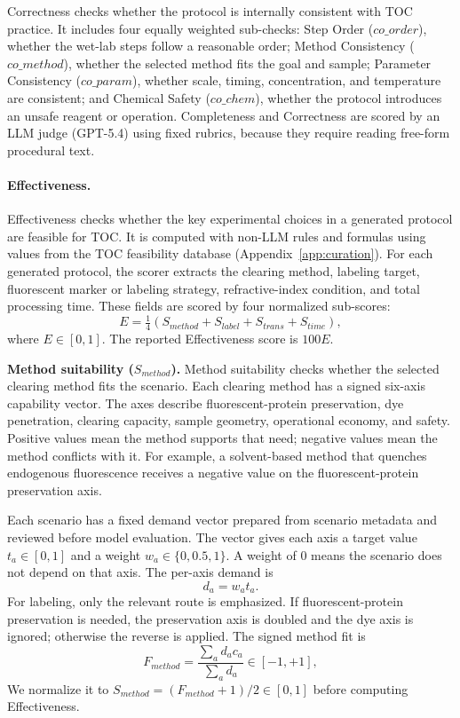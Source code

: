 \documentclass[conference]{IEEEtran}
\begin{document}
Correctness checks whether the protocol is internally consistent with TOC
practice. It includes four equally weighted sub-checks: Step Order
($co\_order$), whether the wet-lab steps follow a reasonable order; Method
Consistency ($co\_method$), whether the selected method fits the goal and
sample; Parameter Consistency ($co\_param$), whether scale, timing,
concentration, and temperature are consistent; and Chemical Safety
($co\_chem$), whether the protocol introduces an unsafe reagent or operation.
Completeness and Correctness are scored by an LLM judge (GPT-5.4) using fixed
rubrics, because they require reading free-form procedural text.

\paragraph{Effectiveness.}
Effectiveness checks whether the key experimental choices in a generated
protocol are feasible for TOC. It is computed with non-LLM rules and formulas
using values from the TOC feasibility database
(Appendix~\ref{app:curation}). For each generated protocol, the scorer extracts
the clearing method, labeling target, fluorescent marker or labeling strategy,
refractive-index condition, and total processing time. These fields are scored
by four normalized sub-scores:
\begin{equation}
E =
\tfrac{1}{4}
\left(
S_{method} + S_{label} + S_{trans} + S_{time}
\right),
\end{equation}
where $E\in[0,1]$. The reported Effectiveness score is $100E$.

\noindent\textbf{Method suitability ($S_{method}$).}
Method suitability checks whether the selected clearing method fits the scenario.
Each clearing method has a signed six-axis capability vector. The axes describe
fluorescent-protein preservation, dye penetration, clearing capacity, sample
geometry, operational economy, and safety. Positive values mean the method
supports that need; negative values mean the method conflicts with it. For
example, a solvent-based method that quenches endogenous fluorescence receives a
negative value on the fluorescent-protein preservation axis.

Each scenario has a fixed demand vector prepared from scenario metadata and
reviewed before model evaluation. The vector gives each axis a target value
$t_a\in[0,1]$ and a weight $w_a\in\{0,0.5,1\}$. A weight of $0$ means the
scenario does not depend on that axis. The per-axis demand is
\[
d_a = w_a t_a .
\]
For labeling, only the relevant route is emphasized. If fluorescent-protein
preservation is needed, the preservation axis is
doubled and the dye axis is ignored; otherwise the reverse is applied.
The signed method fit is
\begin{equation}
F_{method}
= \frac{\sum_a d_a c_a}{\sum_a d_a}
\in[-1,+1],
\end{equation}
We normalize it to
$S_{method}=(F_{method}+1)/2\in[0,1]$ before computing Effectiveness.
\end{document}
